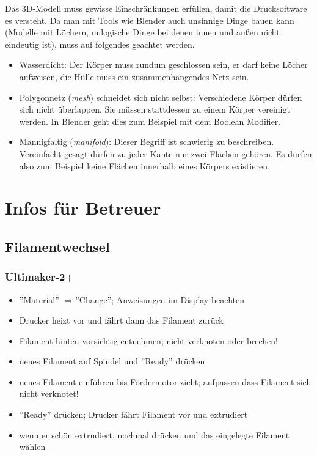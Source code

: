 \documentclass{\basedir/fablab-document}
\newcommand{\fachbegriff}[1]{(\textit{#1})}
\newcommand{\ra}{$\Rightarrow$}
\begin{document}
Das 3D-Modell muss gewisse Einschränkungen erfüllen, damit die Drucksoftware es versteht. Da man mit Tools wie Blender auch unsinnige Dinge bauen kann (Modelle mit Löchern, unlogische Dinge bei denen innen und außen nicht eindeutig ist), muss auf folgendes geachtet werden.
\begin{itemize}
\item Wasserdicht: Der Körper muss rundum geschlossen sein, er darf keine
Löcher aufweisen,  die Hülle muss ein zusammenhängendes Netz sein.
\item Polygonnetz \fachbegriff{mesh} schneidet sich nicht selbst: Verschiedene
Körper dürfen sich nicht überlappen. Sie müssen stattdessen zu einem
Körper vereinigt werden. In Blender geht dies zum Beispiel mit dem
Boolean Modifier.
\item Mannigfaltig \fachbegriff{manifold}: Dieser Begriff ist schwierig zu
beschreiben. Vereinfacht gesagt dürfen zu jeder Kante nur zwei Flächen
gehören. Es dürfen also zum Beispiel keine Flächen innerhalb eines
Körpers existieren.
\end{itemize}


\newpage

\section{Infos für Betreuer}

\subsection{Filamentwechsel}\label{filamentwechsel}

\subsubsection{Ultimaker-2+}
\begin{itemize}
    \item ''Material'' \ra ''Change''; Anweisungen im Display beachten
    \item Drucker heizt vor und fährt dann das Filament zurück
    \item Filament hinten vorsichtig entnehmen; nicht verknoten oder brechen!
    \item neues Filament auf Spindel und ''Ready'' drücken
    \item neues Filament einführen bis Fördermotor zieht; aufpassen dass Filament sich nicht verknotet!
    \item ''Ready'' drücken; Drucker fährt Filament vor und extrudiert
    \item wenn er schön extrudiert, nochmal drücken und das eingelegte Filament wählen
\end{itemize}
\end{document}
